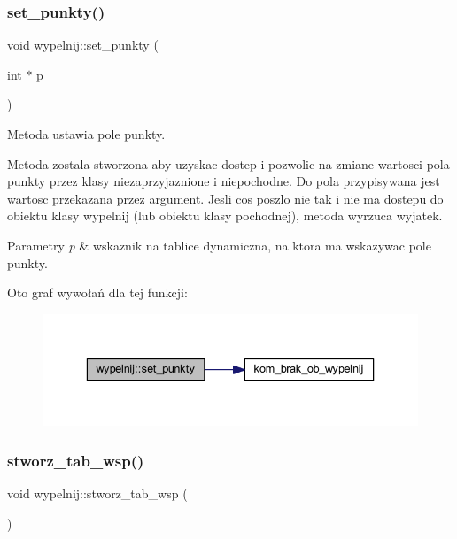 \subsubsection{\texorpdfstring{set\+\_\+punkty()}{set\_punkty()}}
{\footnotesize\ttfamily void wypelnij\+::set\+\_\+punkty (\begin{DoxyParamCaption}\item[{int $\ast$}]{p }\end{DoxyParamCaption})}

Metoda ustawia pole punkty.

Metoda zostala stworzona aby uzyskac dostep i pozwolic na zmiane wartosci pola punkty przez klasy niezaprzyjaznione i niepochodne. Do pola przypisywana jest wartosc przekazana przez argument. Jesli cos poszlo nie tak i nie ma dostepu do obiektu klasy wypelnij (lub obiektu klasy pochodnej), metoda wyrzuca wyjatek. 
\begin{DoxyParams}{Parametry}
{\em p} & wskaznik na tablice dynamiczna, na ktora ma wskazywac pole punkty. \\
\hline
\end{DoxyParams}
Oto graf wywołań dla tej funkcji\+:
\nopagebreak
\begin{figure}[H]
\begin{center}
\leavevmode
\includegraphics[width=336pt]{classwypelnij_a7127a46567e8f6defc6475c96a651c47_cgraph}
\end{center}
\end{figure}
\mbox{\label{classwypelnij_a8dfa84177176a7069f959c988015006f}} 
\subsubsection{\texorpdfstring{stworz\+\_\+tab\+\_\+wsp()}{stworz\_tab\_wsp()}}
{\footnotesize\ttfamily void wypelnij\+::stworz\+\_\+tab\+\_\+wsp (\begin{DoxyParamCaption}{ }\end{DoxyParamCaption})}

